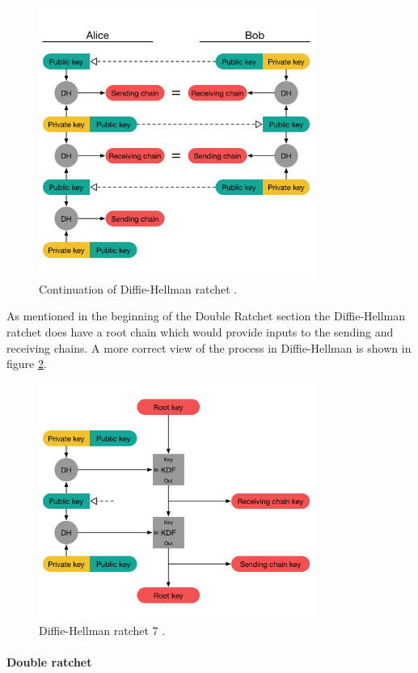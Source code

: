 \begin{figure}[H]
	\centering
	\includegraphics[width=9cm]{figures/dhratchet6.png}
	\caption{Continuation of Diffie-Hellman ratchet  \cite{doubleratchet}.}
	\label{fig:dhratchet2}
\end{figure}


As mentioned in the beginning of the Double Ratchet section the Diffie-Hellman ratchet does have a root chain which would provide inputs to the sending and receiving chains. A more correct view of the process in Diffie-Hellman is shown in figure \ref{fig:dhratchetcon}. 


\begin{figure}[H]
	\centering
	\includegraphics[width=9cm]{figures/dhratchet7.png}
	\caption{Diffie-Hellman ratchet 7 \cite{doubleratchet}.}
	\label{fig:dhratchetcon}
\end{figure}

\paragraph{Double ratchet}

